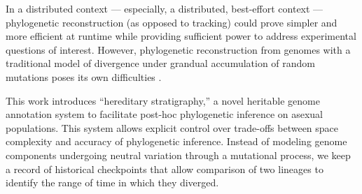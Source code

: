 In a distributed context --- especially, a distributed, best-effort context --- phylogenetic reconstruction (as opposed to tracking) could prove simpler and more efficient at runtime while providing sufficient power to address experimental questions of interest.
However, phylogenetic reconstruction from genomes with a traditional model of divergence under grandual accumulation of random mutations poses its own difficulties \citep{lack2010identifying,casci2008lining,hagstrom2004using,kapli2020phylogenetic,sarkar2010hardware}.


This work introduces ``hereditary stratigraphy,'' a novel heritable genome annotation system to facilitate post-hoc phylogenetic inference on asexual populations.
This system allows explicit control over trade-offs between space complexity and accuracy of phylogenetic inference.
Instead of modeling genome components undergoing neutral variation through a mutational process, we keep a record of historical checkpoints that allow comparison of two lineages to identify the range of time in which they diverged.

